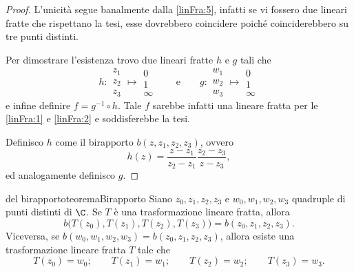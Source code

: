 \begin{proof}
	L'unicità segue banalmente dalla \autoref{linFra:5}, infatti se vi fossero due lineari fratte che rispettano la tesi, esse dovrebbero coincidere poiché coinciderebbero su tre punti distinti.

	Per dimostrare l'esistenza trovo due lineari fratte \(h\) e \(g\) tali che
	\[
		h\colon \begin{matrix}z_1\\z_2\\z_3\end{matrix}\mapsto\begin{matrix}0\\1\\\infty\end{matrix} \qquad\text{e}\qquad g\colon \begin{matrix}w_1\\w_2\\w_3\end{matrix}\mapsto\begin{matrix}0\\1\\\infty\end{matrix}
	\]
	e infine definire \(f = g^{-1}\circ h\).
	Tale \(f\) sarebbe infatti una lineare fratta per le \autoref{linFra:1} e \autoref{linFra:2} e soddisferebbe la tesi.

	Definisco \(h\) come il birapporto \(b(z,z_1,z_2,z_3)\), ovvero
	\[
		h(z) = \frac{z-z_1}{z_2-z_1}\frac{z_2-z_3}{z-z_3},
	\]
	ed analogamente definisco \(g\).
\end{proof}
%
%
\begin{teor}{del birapporto}{teoremaBirapporto}
	Siano \(z_0,z_1,z_2,z_3\) e \(w_0,w_1,w_2,w_3\) quadruple di punti distinti di \(\C\). Se \(T\) è una trasformazione lineare fratta, allora
	\[
		b\big(T(z_0),T(z_1),T(z_2),T(z_3)\big) = b(z_0,z_1,z_2,z_3).
	\]
	Viceversa, se \(b(w_0,w_1,w_2,w_3)=b(z_0,z_1,z_2,z_3)\), allora esiste una trasformazione lineare fratta \(T\) tale che
	\[
		T(z_0) = w_0; \qquad T(z_1) = w_1; \qquad T(z_2) = w_2; \qquad T(z_3) = w_3.
	\]
\end{teor}

